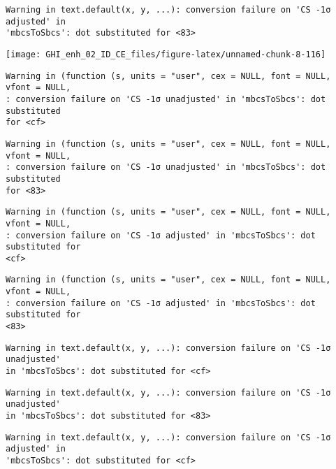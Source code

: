 \documentclass[
  10pt,
  a4paper,oneside]{article}
\begin{document}
\begin{verbatim}
Warning in text.default(x, y, ...): conversion failure on 'CS -1σ adjusted' in
'mbcsToSbcs': dot substituted for <83>
\end{verbatim}

\begin{center}\texttt{[image: GHI\_enh\_02\_ID\_CE\_files/figure-latex/unnamed-chunk-8-116]} \end{center}

\begin{verbatim}
Warning in (function (s, units = "user", cex = NULL, font = NULL, vfont = NULL,
: conversion failure on 'CS -1σ unadjusted' in 'mbcsToSbcs': dot substituted
for <cf>
\end{verbatim}

\begin{verbatim}
Warning in (function (s, units = "user", cex = NULL, font = NULL, vfont = NULL,
: conversion failure on 'CS -1σ unadjusted' in 'mbcsToSbcs': dot substituted
for <83>
\end{verbatim}

\begin{verbatim}
Warning in (function (s, units = "user", cex = NULL, font = NULL, vfont = NULL,
: conversion failure on 'CS -1σ adjusted' in 'mbcsToSbcs': dot substituted for
<cf>
\end{verbatim}

\begin{verbatim}
Warning in (function (s, units = "user", cex = NULL, font = NULL, vfont = NULL,
: conversion failure on 'CS -1σ adjusted' in 'mbcsToSbcs': dot substituted for
<83>
\end{verbatim}

\begin{verbatim}
Warning in text.default(x, y, ...): conversion failure on 'CS -1σ unadjusted'
in 'mbcsToSbcs': dot substituted for <cf>
\end{verbatim}

\begin{verbatim}
Warning in text.default(x, y, ...): conversion failure on 'CS -1σ unadjusted'
in 'mbcsToSbcs': dot substituted for <83>
\end{verbatim}

\begin{verbatim}
Warning in text.default(x, y, ...): conversion failure on 'CS -1σ adjusted' in
'mbcsToSbcs': dot substituted for <cf>
\end{verbatim}
\end{document}
